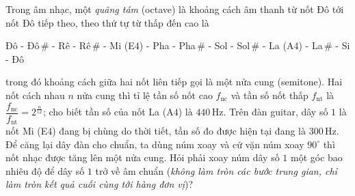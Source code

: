 \begin{ex}%
	Trong âm nhạc, một \textit{quãng tám} (octave) là khoảng cách âm thanh từ nốt Đô tới nốt Đô tiếp theo, theo thứ tự từ thấp đến cao là
	\begin{center}
		Đô - Đô\,\# - Rê  - Rê\,\# - Mi (E$4$) - Pha - Pha\,\# - Sol - Sol\,\# - La (A$4$) - La\,\# - Si - Đô
	\end{center}
	trong đó khoảng cách giữa hai nốt liên tiếp gọi là một nửa cung (semitone). Hai nốt cách nhau $n$ nửa cung thì tỉ lệ tần số nốt cao $f_{\text{nc}}$ và tần số nốt thấp $f_{\text{nt}}$ là $\dfrac{f_{\text{nc}}}{f_{\text{nt}}}=2^{\tfrac{n}{12}}$; cho biết tần số của nốt La (A$4$) là $440$\,Hz. Trên đàn guitar, dây số $1$ là nốt Mi (E$4$) đang bị chùng do thời tiết, tần số đo được hiện tại đang là $300$\,Hz. Để căng lại dây đàn cho chuẩn, ta dùng núm xoay và cứ vặn núm xoay $90^\circ$ thì nốt nhạc được tăng lên một nửa cung. Hỏi phải xoay núm dây số $1$ một góc bao nhiêu độ để dây số $1$ trở về âm chuẩn (\textit{không làm tròn các bước trung gian, chỉ làm tròn kết quả cuối cùng tới hàng đơn vị})?
	\par {}
\end{ex}

